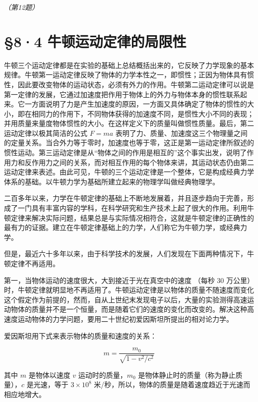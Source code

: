 \emph{（第12题）}

\section{§8·4
牛顿运动定律的局限性}\label{ux725bux987fux8fd0ux52a8ux5b9aux5f8bux7684ux5c40ux9650ux6027}

牛顿三个运动定律都是在实验的基础上总结概括出来的，它反映了力学现象的基本规律。牛顿第一运动定律反映了物体的力学本性之一，即惯性；正因为物体具有惯性，因此要改变物体的运动状态，必须有外力的作用。牛顿第二运动定律可以说是第一定律的发展，它通过加速度把作用于物体上的外力与物体本身的惯性联系起来。它一方面说明了力是产生加速度的原因，一方面又具体确定了物体的惯性的大小，即在相同力的作用下，不同物体获得的加速度不同，是惯性大小不同的表现；并用质量来量度物体惯性的大小。在这样定义下的质量叫做惯性质量。最后，第二运动定律以极其简洁的公式
\(F = ma\)
表明了力、质量、加速度这三个物理量之间的定量关系。当合外力等于零时，加速度也等于零，这正是第一运动定律所叙述的惯性运动。第三运动定律是从``物体之间的作用是相互的''这个事实出发，说明了作用力和反作用力之间的关系，而对相互作用的每个物体来讲，其运动状态仍由第二运动定律来表述。由此可见，牛顿的三个运动定律是一个整体，它是构成经典力学体系的基础。以牛顿力学为基础所建立起来的物理学叫做经典物理学。

二百多年以来，力学在牛顿定律的基础上不断地发展着，并且逐步趋向于完善，形成了一门具有丰富内容的学科，在科学研究和生产技术上起了很大的作用。利用牛顿定律来解决实际问题，结果总是与实际情况相符合，这就是牛顿定律的正确性的最有力的证据。建立在牛顿定律基础上的力学，人们称它为牛顿力学，或经典力学。

但是，最近六十多年以来，由于科学技术的发展，人们发现在下面两种情况下，牛顿定律不再适用。

第一，当物体运动的速度很大，大到接近于光在真空中的速度 （每秒 30
万公里）
时，牛顿定律就明显地不再适用了。牛顿运动定律是以物体的质量不随速度而变化这个假定作为前提的，然而，自从上世纪末发现电子以后，大量的实验测得高速运动物体的质量并不是一个恒量，而是随着它们的速度的变化而改变的。解决这种高速度运动物体的力学问题，要用二十世纪初爱因斯坦所提出的相对论力学。

爱因斯坦用下式来表示物体的质量和速度的关系：

\[
m = \frac {m _ {0}}{\sqrt {1 - v ^ {2} / c ^ {2}}}
\]

其中 \(m\) 是物体以速度 \(v\) 运动时的质量，\(m_0\)
是物体静止时的质量（称为静止质量），\(c\) 是光速，等于
\(3 \times 10^{8}\)
米/秒，所以，物体的质量是随着速度趋近于光速而相应地增大。

